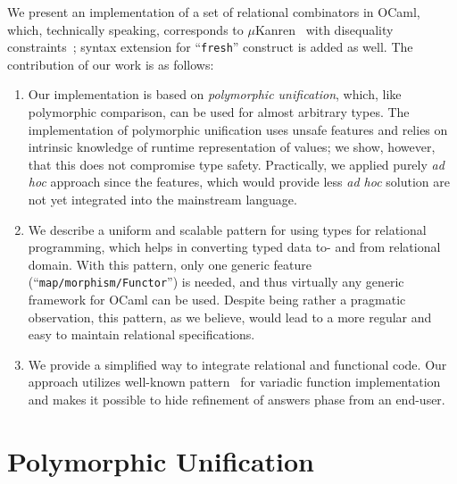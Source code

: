\documentclass[10pt, oneside, nocopyrightspace]{sigplanconf}
\begin{document}
We present an implementation of a set of relational combinators in OCaml, which, 
technically speaking, corresponds to $\mu$Kanren~\cite{MicroKanren} with disequality 
constraints~\cite{CKanren}; syntax extension for ``\lstinline{fresh}'' construct is
added as well. The contribution of our work is as follows:

\begin{enumerate}
\item Our implementation is based on \emph{polymorphic unification}, which, like polymorphic comparison,
can be used for almost arbitrary types. The implementation of polymorphic unification uses unsafe features and
relies on intrinsic knowledge of runtime representation of values; we show, however, that this does not
compromise type safety. Practically, we applied purely \emph{ad hoc} approach since the features, 
which would provide less \emph{ad hoc} solution are not yet integrated into the mainstream language.

\item We describe a uniform and scalable pattern for using types for relational programming, which
helps in converting typed data to- and from relational domain. With this pattern, only one
generic feature (``\lstinline{map/morphism/Functor}'') is needed, and thus virtually any generic 
framework for OCaml can be used. Despite being rather a pragmatic observation, this pattern, as we
believe, would lead to a more regular and easy to maintain relational specifications.

\item We provide a simplified way to integrate relational and functional code. Our approach utilizes
well-known pattern~\cite{Unparsing, DoWeNeed} for variadic function implementation and makes it
possible to hide refinement of answers phase from an end-user.
\end{enumerate}

\section{Polymorphic Unification}
\label{polyuni}
\end{document}
